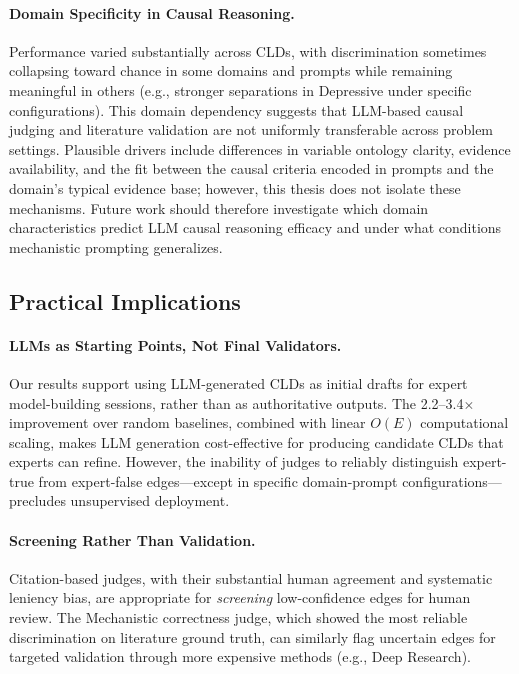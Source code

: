 \paragraph{Domain Specificity in Causal Reasoning.}
Performance varied substantially across CLDs, with discrimination sometimes collapsing toward chance in some domains and prompts while remaining meaningful in others (e.g., stronger separations in Depressive under specific configurations). This domain dependency suggests that LLM-based causal judging and literature validation are not uniformly transferable across problem settings. Plausible drivers include differences in variable ontology clarity, evidence availability, and the fit between the causal criteria encoded in prompts and the domain's typical evidence base; however, this thesis does not isolate these mechanisms. Future work should therefore investigate which domain characteristics predict LLM causal reasoning efficacy and under what conditions mechanistic prompting generalizes.

\subsection{Practical Implications}
\label{sec:conclusion_practice}

\paragraph{LLMs as Starting Points, Not Final Validators.}
Our results support using LLM-generated CLDs as initial drafts for expert model-building sessions, rather than as authoritative outputs. The 2.2--3.4$\times$ improvement over random baselines, combined with linear $O(E)$ computational scaling, makes LLM generation cost-effective for producing candidate CLDs that experts can refine. However, the inability of judges to reliably distinguish expert-true from expert-false edges---except in specific domain-prompt configurations---precludes unsupervised deployment.

\paragraph{Screening Rather Than Validation.}
Citation-based judges, with their substantial human agreement and systematic leniency bias, are appropriate for \textit{screening} low-confidence edges for human review. The Mechanistic correctness judge, which showed the most reliable discrimination on literature ground truth, can similarly flag uncertain edges for targeted validation through more expensive methods (e.g., Deep Research).

